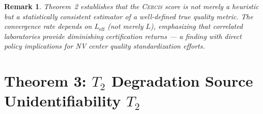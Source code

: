 \documentclass[11pt,a4paper]{article}
\newcommand{\eff}{\mathrm{eff}}
\newtheorem{remark}[theorem]{Remark}
\theoremstyle{definition}
\newcommand{\Cercis}{\textsc{Cercis}}
\newcommand{\Ttwo}{T_2}
\newcommand{\NV}{NV}
\begin{document}
\begin{remark}
Theorem~2 establishes that the \Cercis{} score is not merely a heuristic
but a statistically consistent estimator of a well-defined true quality
metric. The convergence rate depends on $L_{\eff}$ (not merely $L$),
emphasizing that correlated laboratories provide diminishing certification
returns — a finding with direct policy implications for \NV{} center
quality standardization efforts.
\end{remark}

\section{Theorem 3: $\Ttwo$ Degradation Source Unidentifiability $\Ttwo$}
\label{sec:thm3}
\end{document}
